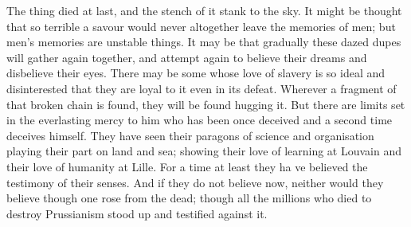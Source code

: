 \documentclass{book}
\begin{document}
The thing died at last, and the stench of it stank to the sky. It might be thought that so terrible a savour would never altogether leave the memories of men; but men’s memories are unstable things. It may be that gradually these dazed dupes will gather again together, and attempt again to believe their dreams and disbelieve their eyes. There may be some whose love of slavery is so ideal and disinterested that they are loyal to it even in its defeat. Wherever a fragment of that broken chain is found, they will be found hugging it. But there are limits set in the everlasting mercy to him who has been once deceived and a second time deceives himself. They have seen their paragons of science and organisation playing their part on land and sea; showing their love of learning at Louvain and their love of humanity at Lille. For a time at least they ha ve believed the testimony of their senses. And if they do not believe now, neither would they believe though one rose from the dead; though all the millions who died to destroy Prussianism stood up and testified against it.
\end{document}
